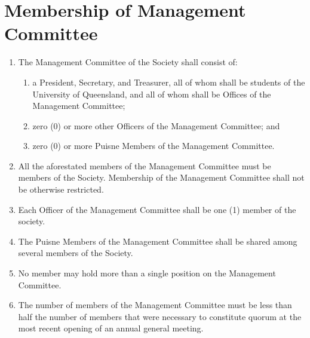 \documentclass[a4paper]{article}
\newcommand*{\sectionr}[1]{{\raggedright \section{#1}}}
\begin{document}
\sectionr{Membership of Management Committee}
\begin{enumerate}
\item The Management Committee of the Society shall consist of:
	\begin{enumerate}
	\item a President, Secretary, and Treasurer, all of whom shall be students of the University of Queensland, and all of whom shall be Offices of the Management Committee;
	\item zero (0) or more other Officers of the Management Committee; and
	\item zero (0) or more Puisne Members of the Management Committee.
	\end{enumerate}
\item All the aforestated members of the Management Committee must be members of the Society. Membership of the Management Committee shall not be otherwise restricted.
\item Each Officer of the Management Committee shall be one (1) member of the society.
\item The Puisne Members of the Management Committee shall be shared among several members of the Society.
\item No member may hold more than a single position on the Management Committee.
\item The number of members of the Management Committee must be less than half the number of members that were necessary to constitute quorum at the most recent opening of an annual general meeting.
\end{enumerate}
\end{document}
